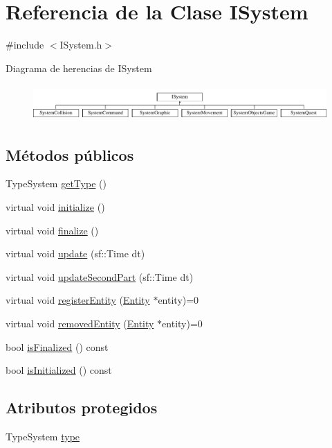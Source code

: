 \hypertarget{classISystem}{}\section{Referencia de la Clase I\+System}
\label{classISystem}


{\ttfamily \#include $<$I\+System.\+h$>$}

Diagrama de herencias de I\+System\begin{figure}[H]
\begin{center}
\leavevmode
\includegraphics[height=1.382716cm]{classISystem}
\end{center}
\end{figure}
\subsection*{Métodos públicos}
\begin{DoxyCompactItemize}
\item 
Type\+System \hyperlink{classISystem_a6e94810e4a308aa6ae5ed03411a86800}{get\+Type} ()
\item 
virtual void \hyperlink{classISystem_ac9b257acd7d03dbd7aab149792ff98af}{initialize} ()
\item 
virtual void \hyperlink{classISystem_a4cc1cac06100c45d260a23d24d5618d6}{finalize} ()
\item 
virtual void \hyperlink{classISystem_a6931efd2517fd0c81237beeb04297421}{update} (sf\+::\+Time dt)
\item 
virtual void \hyperlink{classISystem_aef2545bd6ffac18186b566e4d3d2804b}{update\+Second\+Part} (sf\+::\+Time dt)
\item 
virtual void \hyperlink{classISystem_aaaef32b093b566b0573cb23e00f8c7ae}{register\+Entity} (\hyperlink{classEntity}{Entity} $\ast$entity)=0
\item 
virtual void \hyperlink{classISystem_a0e966d506838cfe09543ad4ccafa4998}{removed\+Entity} (\hyperlink{classEntity}{Entity} $\ast$entity)=0
\item 
bool \hyperlink{classISystem_ad5471c17b45154b31063a1ecbce4eeaa}{is\+Finalized} () const 
\item 
bool \hyperlink{classISystem_a6c075151dc75d7ee731947849b35f1d6}{is\+Initialized} () const 
\end{DoxyCompactItemize}
\subsection*{Atributos protegidos}
\begin{DoxyCompactItemize}
\item 
Type\+System \hyperlink{classISystem_ae9154cb0a7d9560f0bfa9169a384a995}{type}
\end{DoxyCompactItemize}


